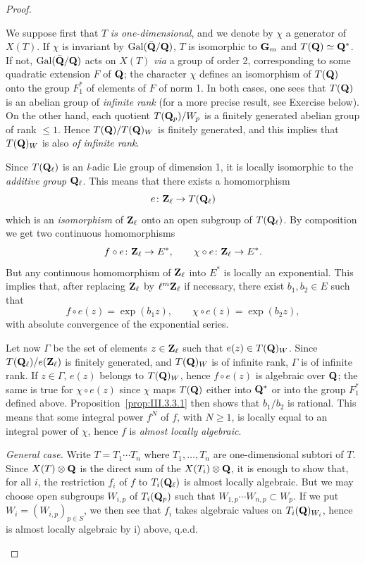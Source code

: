 \begin{proof}
\begin{alist}[label=\roman*)]
\item We suppose first that $T$ \emph{is one-dimensional}, and we
denote by $\chi$ a generator of $X(T)$.  If $\chi$ is invariant by
$\mathrm{Gal}(\bar{\mathbf{Q}}/\mathbf{Q})$, $T$ is isomorphic to $\mathbf{G}_m$ and
$T(\mathbf{Q})\simeq\mathbf{Q}^*$.  If not, $\mathrm{Gal}(\bar{\mathbf{Q}}/\mathbf{Q})$ acts on $X(T)$
\emph{via} a group of order 2, corresponding to some quadratic
extension $F$ of $\mathbf{Q}$; the character $\chi$ defines an isomorphism
of $T(\mathbf{Q})$ onto the group $F_1^*$ of elements of $F$ of norm 1.  In
both cases, one sees that $T(\mathbf{Q})$ is an abelian group of
\emph{infinite rank} (for a more precise result, see Exercise
below).  On the other hand, each quotient $T(\mathbf{Q}_p)/W_p$ is a
finitely generated abelian group of rank $\leq 1$.  Hence
$T(\mathbf{Q})/T(\mathbf{Q})_W$ is finitely generated, and this implies that
$T(\mathbf{Q})_W$ is also \emph{of infinite rank}.

Since $T(\mathbf{Q}_\ell)$ is an \textit{l}-adic Lie group of dimension 1,
it is locally isomorphic to the \emph{additive group} $\mathbf{Q}_\ell$.
This means that there exists a homomorphism
\[
e\colon \mathbf{Z}_\ell\to T(\mathbf{Q}_\ell)
\]
which is an \emph{isomorphism} of $\mathbf{Z}_\ell$ onto an open subgroup
of $T(\mathbf{Q}_\ell)$.  By composition we get two continuous
homomorphisms
\[
f\circ e\colon \mathbf{Z}_\ell\to E^*,\qquad
\chi\circ e\colon \mathbf{Z}_\ell\to E^*.
\]
But any continuous homomorphism of $\mathbf{Z}_\ell$ into $E^*$ is locally
an exponential.  This implies that, after replacing $\mathbf{Z}_\ell$ by
$\ell^m\mathbf{Z}_\ell$ if necessary, there exist $b_1,b_2\in E$ such that
\[
f\circ e(z)=\exp(b_1z),\qquad
\chi\circ e(z)=\exp(b_2z),
\]
with absolute convergence of the exponential series.

Let now $\Gamma$ be the set of elements $z\in\mathbf{Z}_\ell$ such that
$e(z)\in T(\mathbf{Q})_W$.  Since $T(\mathbf{Q}_\ell)/e(\mathbf{Z}_\ell)$ is finitely
generated, and $T(\mathbf{Q})_W$ is of infinite rank, $\Gamma$ is of
infinite rank.  If $z\in\Gamma$, $e(z)$ belongs to $T(\mathbf{Q})_W$, hence
$f\circ e(z)$ is algebraic over $\mathbf{Q}$; the same is true for
$\chi\circ e(z)$ since $\chi$ maps $T(\mathbf{Q})$ either into $\mathbf{Q}^*$ or
into the group $F_1^*$ defined above.
Proposition~\ref{prop:III.3.3.1} then shows that $b_1/b_2$ is
rational.  This means that some integral power $f^N$ of $f$, with
$N\geq 1$, is locally equal to an integral power of $\chi$, hence
$f$ is \emph{almost locally algebraic}.

\item \emph{General case.}  Write $T=T_1\cdots T_n$ where
$T_1,\ldots,T_n$ are one-dimensional subtori of $T$.  Since
$X(T)\mathbin{\otimes}\mathbf{Q}$ is the direct sum of the $X(T_i)\mathbin{\otimes}\mathbf{Q}$, it is
enough to show that, for all $i$, the restriction $f_i$ of $f$ to
$T_i(\mathbf{Q}_\ell)$ is almost locally algebraic.  But we may choose open
subgroups $W_{i,p}$ of $T_i(\mathbf{Q}_p)$ such that
$W_{1,p}\cdots W_{n,p}\subset W_p$.  If we put
$W_i=(W_{i,p})_{p\in S}$, we then see that $f_i$ takes algebraic
values on $T_i(\mathbf{Q})_{W_i}$, hence is almost locally algebraic by i)
above, q.e.d.
\end{alist}
\end{proof}

